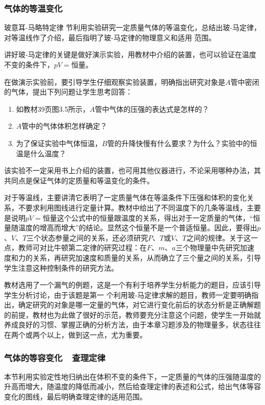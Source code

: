 \subsubsection{气体的等温变化}
 玻意耳-马略特定律 节利用实验研究一定质量气体的等温变化，总结出玻-马定律，对等温线作了介绍，最后指明了玻-马定律的物理意义和适用
 范围。

 讲好玻-马定律的关键是做好演示实验，用教材中介绍的装置，也可以验证在温度不变的条件下，$pV=$恒量。

 在做演示实验前，要引导学生仔细观察实验装置，明确指出研究对象是$A$管中密闭的气体，提出下列问题让学生思考回答：
 \begin{enumerate}
 \item 如教材39页图3.5所示，$A$管中气体的压强的表达式是怎样的？
 \item $A$管中的气体体积怎样确定？
 \item 为了保证实验中气体恒温，$B$管的升降快慢有什么要求？为什么？实验中的恒温是什么温度？
 \end{enumerate}

 该实验不一定采用书上介绍的装置，也可用其他仪器进行，不论采用哪种办法，其共同点是保证气体的定质量和等温变化的条件。 

 对于等温线，主要讲清它表明了一定质量气体在等温条件下压强和体积的变化关系，不要求利用图线进行定量计算。教材中给出了不同温度下的几条等温线，主要是说明$pV=$恒量这个公式中的恒量跟温度的关系，得出对于一定质量的气体，“恒量随温度的增高而增大”的结论。显然这个恒量不是一个普适恒量。因此，要得出$p$、$V$、$T$三个状态参量之间的关系，还必须研究$P$、$T$或$V$、$T$之间的规律。关于这一点，教师可对比牛顿第二定律的研究过程：在$F$、$m$、$a$三个物理量中先研究加速度和力的关系，再研究加速度和质量的关系，从而确立了三个量之间的关系，引导学生注意这种控制条件的研究方法。

 教材选用了一个漏气的例题，这是一个有利于培养学生分析能力的题目，应该引导学生分析讨论，由于该题是第一
 个利用玻-马定律求解的题目，教师一定要明确指出，确定研究的对象是哪一定量的气体，对它进行变化前后的状态分析是正确解题的前提，教材也为此做了很好的示范，教师要充分注意这个问题，使学生一开始就养成良好的习惯、掌握正确的分析方法，由于本章习题涉及的物理量多，状态往往在两个或两个以上，做到这一点，尤为重要。

\subsubsection{气体的等容变化~~查理定律}

本节利用实验定性地归纳出在体积不变的条件下，一定质量的气体的压强随温度的升高而增大，随温度的降低而减小，然后给查理定律的表述和公式，给出气体等容变化的图线，最后明确查理定律的适用范围。

